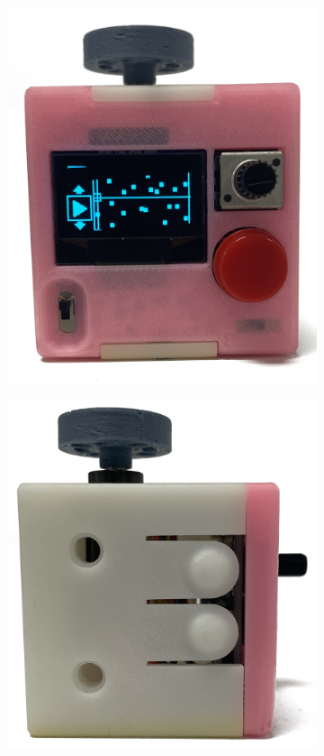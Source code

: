 \begin{figure}[H]
\begin{subfigure}[b]{0.25\textwidth}
        \includegraphics[width=\linewidth]{overleaf/images/front.png}
    \end{subfigure}
    \begin{subfigure}[b]{0.25\textwidth}
        \includegraphics[width=\linewidth]{overleaf/images/left.png}

\end{subfigure}
\end{figure}
